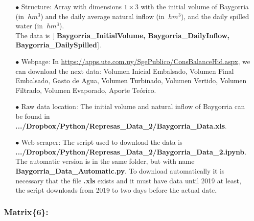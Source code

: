 \documentclass[12pt]{article}
\theoremstyle{definition}
\theoremstyle{remark}
\begin{document}
\begin{enumerate}

\item[$\bullet$] Structure: Array with dimensions $1\times3$ with the initial volume of Baygorria (in $\SI{}{hm^3}$) and the daily average natural inflow (in $\SI{}{hm^3}$), and the daily spilled water (in $\SI{}{hm^3}$).\\
The data is [\textbf{{\color{blue} Baygorria\_InitialVolume, Baygorria\_DailyInflow, Baygorria\_DailySpilled}]}.

\item[$\bullet$] Webpage: In {\color{blue} \url{https://apps.ute.com.uy/SgePublico/ConsBalanceHid.aspx}}, we can download the next data: {\color{orange} Volumen Inicial Embalsado, Volumen Final Embalsado, Gasto de Agua,  Volumen Turbinado, Volumen Vertido, Volumen Filtrado, Volumen Evaporado, Aporte Te\'orico}.

\item[$\bullet$] Raw data location: The initial volume and natural inflow of Baygorria can be found in \textbf{.../Dropbox/Python/Represas\_Data\_2/Baygorria\_Data.xls}.

\item[$\bullet$] Web scraper: The script used to download the data is \textbf{.../Dropbox/Python/Represas\_Data\_2/Baygorria\_Data\_2.ipynb}. The automatic version is in the same folder, but with name \textbf{Baygorria\_Data\_Automatic.py}. To download automatically it is necessary that the file \textbf{.xls} exists and it must have data until 2019 at least, the script downloads from 2019 to two days before the actual date.

\end{enumerate}

\subsubsection{Matrix\{6\}:}
\end{document}
